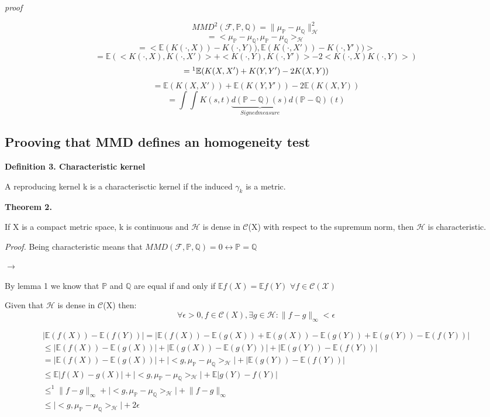 \documentclass[8pt,a4paper]{article}
\providecommand{\abs}[1]{\lvert#1\rvert}
\providecommand{\norm}[1]{\lVert#1\rVert}
\begin{document}
\textit{proof}

$$MMD^{2}(\mathcal{F},\mathbb{P},\mathbb{Q}) = \norm{\mu_{\mathbb{P}}- \mu_{\mathbb{Q}}}_{\mathcal{H}}^{2}$$
$$=<\mu_{\mathbb{P}}- \mu_{\mathbb{Q}},\mu_{\mathbb{P}}- \mu_{\mathbb{Q}}>_{\mathcal{H}}$$
$$=<\mathbb{E}(K(\cdot,X))-K(\cdot,Y)),\mathbb{E}(K(\cdot,X'))-K(\cdot,Y'))>$$
$$=\mathbb{E}(<K(\cdot,X),K(\cdot,X')> + <K(\cdot,Y),K(\cdot,Y')> - 2<K(\cdot,X)K(\cdot,Y)>)$$
$$=\footnote{is due to the reproductive property of the kernel.} \mathbb{E}(K(X,X') + K(Y,Y') -2K(X,Y))
$$
$$= \mathbb{E}(K(X,X')) + \mathbb{E}(K(Y,Y')) -2\mathbb{E}(K(X,Y))
$$
$$= \int\int K(s,t) \underbrace{d(\mathbb{P}-\mathbb{Q})(s)}_{Signed measure} d(\mathbb{P}-\mathbb{Q})(t)
$$

\subsection*{Prooving that MMD defines an homogeneity test}

\textsf{\textbf{Definition 3. Characteristic kernel}}

A reproducing kernel k is a characterisctic kernel if the induced $\gamma_{k}$ is a metric.

\textsf{\textbf{Theorem 2.}}

If X is a compact metric space, k is continuous and $\mathcal{H}$ is dense in $\mathcal{C}$(X) with respect to the supremum norm, then $\mathcal{H}$ is characteristic.

\textit{Proof.}
Being characteristic means that 
$MMD(\mathcal{F},\mathbb{P},\mathbb{Q}) = 0 \leftrightarrow \mathbb{P} = \mathbb{Q}$
\begin{flushleft}
$\rightarrow$
\end{flushleft}

By lemma 1 we know that $\mathbb{P}$ and $\mathbb{Q}$  are equal if and only if $\mathbb{E}f(X) = \mathbb{E}f(Y)$  $\forall f \in \mathcal{C(X)}$

Given that $\mathcal{H}$ is dense in $\mathcal{C}$(X) then:
$$\forall \epsilon >0, f\in\mathcal{C}(X), \exists g\in \mathcal{H} : \norm{f-g}_{\infty} < \epsilon$$

\begin{align*}
\abs{\mathbb{E}(f(X)) - \mathbb{E}(f(Y))}  = \abs{\mathbb{E}(f(X)) - \mathbb{E}(g(X)) + \mathbb{E}(g(X)) - \mathbb{E}(g(Y)) +\mathbb{E}(g(Y)) - \mathbb{E}(f(Y))} \\
\leq \abs{\mathbb{E}(f(X)) - \mathbb{E}(g(X))} + \abs{\mathbb{E}(g(X)) - \mathbb{E}(g(Y))} +\abs{\mathbb{E}(g(Y)) - \mathbb{E}(f(Y))}\\
= \abs{\mathbb{E}(f(X)) - \mathbb{E}(g(X))} + \abs{<g,\mu_{\mathbb{P}}-\mu_{\mathbb{Q}}>_{\mathcal{H}} } +\abs{\mathbb{E}(g(Y)) - \mathbb{E}(f(Y))} \\
\leq \mathbb{E}\abs{f(X) - g(X)} + \abs{<g,\mu_{\mathbb{P}}-\mu_{\mathbb{Q}}>_{\mathcal{H}} } +\mathbb{E}\abs{g(Y) - f(Y)} \\ \leq^{1} \norm{f-g}_{\infty}  + \abs{<g,\mu_{\mathbb{P}}-\mu_{\mathbb{Q}}>_{\mathcal{H}} } + \norm{f-g}_{\infty} 
\\
\leq \abs{<g,\mu_{\mathbb{P}}-\mu_{\mathbb{Q}}>_{\mathcal{H}} } + 2\epsilon
\end{align*}
\end{document}
